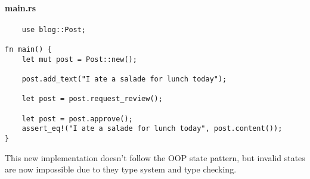 \paragraph*{main.rs}\begin{lstlisting}
    use blog::Post;

fn main() {
    let mut post = Post::new();

    post.add_text("I ate a salade for lunch today");

    let post = post.request_review();

    let post = post.approve();
    assert_eq!("I ate a salade for lunch today", post.content());
}
\end{lstlisting}

This new implementation doesn't follow the OOP state pattern, but invalid states are now impossible due to they type system and type checking.

